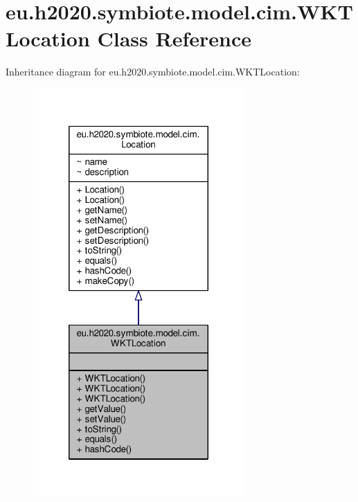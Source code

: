 \hypertarget{classeu_1_1h2020_1_1symbiote_1_1model_1_1cim_1_1WKTLocation}{}\section{eu.\+h2020.\+symbiote.\+model.\+cim.\+W\+K\+T\+Location Class Reference}
\label{classeu_1_1h2020_1_1symbiote_1_1model_1_1cim_1_1WKTLocation}


Inheritance diagram for eu.\+h2020.\+symbiote.\+model.\+cim.\+W\+K\+T\+Location\+:\nopagebreak
\begin{figure}[H]
\begin{center}
\leavevmode
\includegraphics[width=228pt]{classeu_1_1h2020_1_1symbiote_1_1model_1_1cim_1_1WKTLocation__inherit__graph}
\end{center}
\end{figure}


